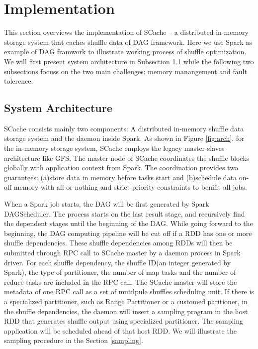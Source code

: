 \documentclass[10pt,twocolumn]{article}
\begin{document}
\section{Implementation}\label{impl}
This section overviews the implementation of SCache -- a distributed in-memory storage system that caches shuffle data of DAG framework. Here we use Spark as example of DAG framwork to illustrate working process of shuffle optimization. We will first present system architecture in Subsection \ref{arch} while the following two subsections focuss on the two main challenges: memory manangement and fault tolerence.
\subsection{System Architecture}\label{arch}
SCache consists mainly two components: A distributed in-memory shuffle data storage system and the daemon inside Spark. As shown in Figure \ref{fig:arch}, for the in-memory storage system, SCache employs the legacy master-slaves architecture like GFS\cite{gfs}. The master node of SCache coordinates the shuffle blocks globally with application context from Spark. The coordination provides two guarantees: (a)store data in memory before tasks start and (b)schedule data on-off memory with all-or-nothing and strict priority constraints to benifit all jobs. 

When a Spark job starts, the DAG will be first generated by Spark DAGScheduler\cite{sparksource}. The process starts on the last result stage, and recursively find the dependent stages until the beginning of the DAG. While going forward to the beginning, the DAG computing pipeline will be cut off if a RDD has one or more shuffle dependencies. These shuffle dependencies among RDDs will then be submitted through RPC call to SCache master by a daemon process in Spark driver. For each shuffle dependency, the shuffle ID(an integer generated by Spark), the type of partitioner, the number of map tasks and the number of reduce tasks are included in the RPC call. The SCache master will store the metadata of one RPC call as a set of mutilpule shuffles scheduling unit. If there is a specialized partitioner, such as Range Partitioner or a customed paritioner, in the shuffle dependencies, the daemon will insert a sampling program in the host RDD that generates shuffle output using specialized partitioner. The sampling application will be scheduled ahead of that host RDD. We will illustrate the sampling procedure in the Section \ref{sampling}.
\end{document}
